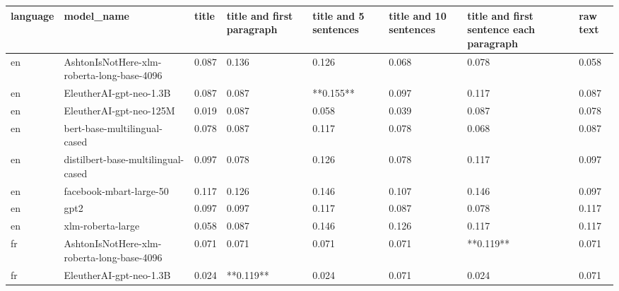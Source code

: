 \begin{tabular}{llllllll}
\toprule
language &                                 model\_name & title & title and first paragraph & title and 5 sentences & title and 10 sentences & title and first sentence each paragraph &  raw text \\
\midrule
      en & AshtonIsNotHere-xlm-roberta-long-base-4096 & 0.087 &                     0.136 &                 0.126 &                  0.068 &                                   0.078 &     0.058 \\
      en &                    EleutherAI-gpt-neo-1.3B & 0.087 &                     0.087 &             **0.155** &                  0.097 &                                   0.117 &     0.087 \\
      en &                    EleutherAI-gpt-neo-125M & 0.019 &                     0.087 &                 0.058 &                  0.039 &                                   0.087 &     0.078 \\
      en &               bert-base-multilingual-cased & 0.078 &                     0.087 &                 0.117 &                  0.078 &                                   0.068 &     0.087 \\
      en &         distilbert-base-multilingual-cased & 0.097 &                     0.078 &                 0.126 &                  0.078 &                                   0.117 &     0.097 \\
      en &                    facebook-mbart-large-50 & 0.117 &                     0.126 &                 0.146 &                  0.107 &                                   0.146 &     0.097 \\
      en &                                       gpt2 & 0.097 &                     0.097 &                 0.117 &                  0.087 &                                   0.078 &     0.117 \\
      en &                          xlm-roberta-large & 0.058 &                     0.087 &                 0.146 &                  0.126 &                                   0.117 &     0.117 \\
      fr & AshtonIsNotHere-xlm-roberta-long-base-4096 & 0.071 &                     0.071 &                 0.071 &                  0.071 &                               **0.119** &     0.071 \\
      fr &                    EleutherAI-gpt-neo-1.3B & 0.024 &                 **0.119** &                 0.024 &                  0.071 &                                   0.024 &     0.071 \\

\end{tabular}
